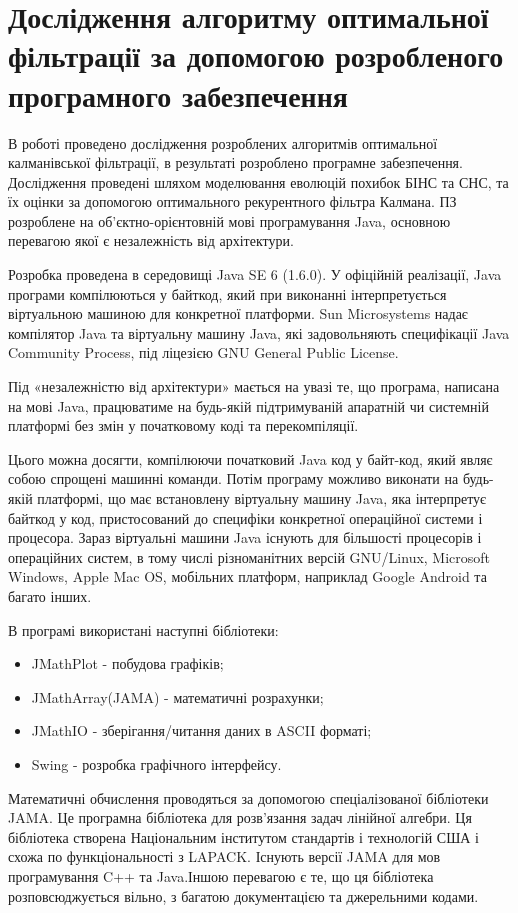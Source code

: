 \section{Дослідження алгоритму оптимальної фільтрації за допомогою розробленого програмного забезпечення}
В роботі проведено дослідження розроблених алгоритмів оптимальної калманівської фільтрації, в результаті розроблено програмне забезпечення. Дослідження проведені шляхом моделювання еволюцій похибок БІНС та СНС, та їх оцінки за допомогою оптимального рекурентного фільтра Калмана. ПЗ розроблене на об'єктно-орієнтовній мові програмування Java, основною перевагою якої є незалежність від архітектури.

Розробка проведена в середовищі Java SE 6 (1.6.0). У офіційній реалізації, Java програми компілюються у байткод, який при виконанні інтерпретується віртуальною машиною для конкретної платформи. Sun Microsystems надає компілятор Java та віртуальну машину Java, які задовольняють специфікації Java Community Process, під ліцезією GNU General Public License. 

Під «незалежністю від архітектури» мається на увазі те, що програма, написана на мові Java, працюватиме на будь-якій підтримуваній апаратній чи системній платформі без змін у початковому коді та перекомпіляції.

Цього можна досягти, компілюючи початковий Java код у байт-код, який являє собою спрощені машинні команди. Потім програму можливо виконати на будь-якій платформі, що має встановлену віртуальну машину Java, яка інтерпретує байткод у код, пристосований до специфіки конкретної операційної системи і процесора. Зараз віртуальні машини Java існують для більшості процесорів і операційних систем, в тому числі різноманітних версій GNU/Linux, Microsoft Windows, Apple Mac OS, мобільних платформ, наприклад Google Android та багато інших.

В програмі використані наступні бібліотеки:
\begin{itemize}
  \item JMathPlot - побудова графіків;
  \item JMathArray(JAMA) - математичні розрахунки;
  \item JMathIO - зберігання/читання даних в ASCII форматі;
  \item Swing - розробка графічного інтерфейсу.
\end{itemize}

Математичні обчислення проводяться за допомогою спеціалізованої бібліотеки JAMA. Це програмна бібліотека для розв'язання задач лінійної алгебри. Ця бібліотека створена Національним інститутом стандартів і технологій США і схожа по функціональності з LAPACK. Існують версії JAMA для мов програмування C++ та Java.Іншою перевагою є те, що ця бібліотека розповсюджується вільно, з багатою документацією та джерельними кодами.

